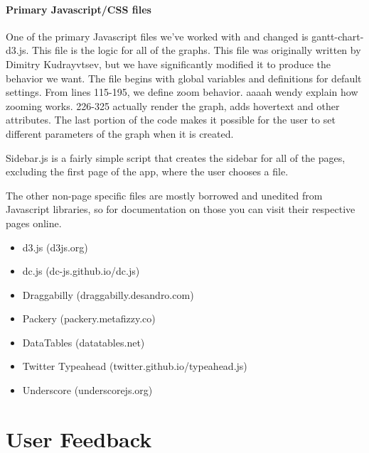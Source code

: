 \documentclass{hmcclinic}
\begin{document}
  \subsubsection{Primary Javascript/CSS files}
  One of the primary Javascript files we've worked
  with and changed is gantt-chart-d3.js. This file is the logic for all of the
  graphs. This file was originally written by Dimitry Kudrayvtsev, but we have
  significantly modified it to produce the behavior we want. The file begins
  with global variables and definitions for default settings. From lines
  115-195, we define zoom behavior. aaaah wendy explain how zooming works.
  226-325 actually render the graph, adds hovertext and other attributes. The
  last portion of the code makes it possible for the user to set different
  parameters of the graph when it is created.

  Sidebar.js is a fairly simple script that creates the sidebar for all of the
  pages, excluding the first page of the app, where the user chooses a file.

  The other non-page specific files are mostly borrowed and unedited from
  Javascript libraries, so for documentation on those you can visit their
  respective pages online.
\begin{itemize}
\item d3.js (d3js.org)
\item dc.js (dc-js.github.io/dc.js)
\item Draggabilly (draggabilly.desandro.com)
\item Packery (packery.metafizzy.co)
\item DataTables (datatables.net)
\item Twitter Typeahead (twitter.github.io/typeahead.js)
\item Underscore (underscorejs.org)
\end{itemize}

\chapter{User Feedback} %
\end{document}
